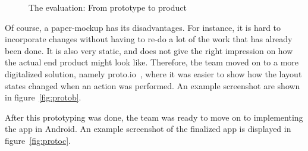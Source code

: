 \begin{figure}[H]
  \centering
\quad
\quad
\caption{The evaluation: From prototype to product}
\end{figure}

\noindent Of course, a paper-mockup has its disadvantages. For instance, it is hard to incorporate changes without having to re-do a lot of the work that has already been done. It is also very static, and does not give the right impression on how the actual end product might look like. Therefore, the team moved on to a more digitalized solution, namely proto.io~\cite{protoio}, where it was easier to show how the layout states changed when an action was performed. An example screenshot are shown in figure~\ref{fig:protob}.

After this prototyping was done, the team was ready to move on to implementing the app in Android. An example screenshot of the finalized app is displayed in figure~\ref{fig:protoc}.

